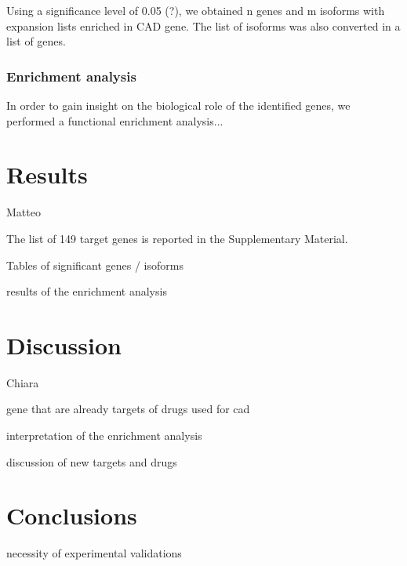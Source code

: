 \documentclass[fleqn,10pt]{SelfArx} %
\begin{document}
Using a significance level of 0.05 (?), we obtained n genes and m isoforms with expansion lists enriched in CAD gene. The list of isoforms was also converted in a list of genes.

\subsubsection{Enrichment analysis}

In order to gain insight on the biological role of the identified genes, we performed a functional enrichment analysis...


\section*{Results}
Matteo

The list of 149 target genes is reported in the Supplementary Material.

Tables of significant genes / isoforms 

results of the enrichment analysis

\section*{Discussion}
Chiara

gene that are already targets of drugs used for cad

interpretation of the enrichment analysis

discussion of new targets and drugs

\section*{Conclusions}

necessity of experimental validations
\end{document}
